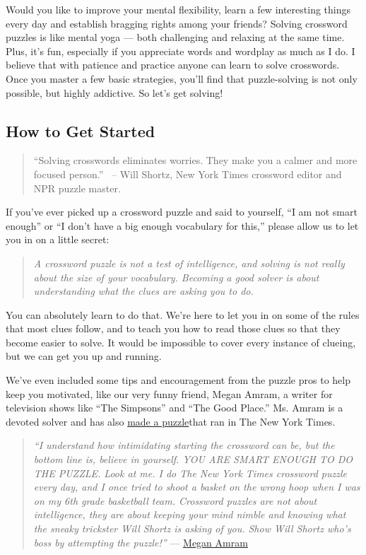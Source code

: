 Would you like to improve your mental flexibility, learn a few
interesting things every day and establish bragging rights among your
friends? Solving crossword puzzles is like mental yoga --- both
challenging and relaxing at the same time. Plus, it's fun, especially if
you appreciate words and wordplay as much as I do. I believe that with
patience and practice anyone can learn to solve crosswords. Once you
master a few basic strategies, you'll find that puzzle-solving is not
only possible, but highly addictive. So let's get solving!

\hypertarget{how-to-get-started}{%
\subsection{How to Get Started}\label{how-to-get-started}}

\begin{quote}
``Solving crosswords eliminates worries. They make you a calmer and more
focused person.'' ~-- Will Shortz, New York Times crossword editor and
NPR puzzle master.
\end{quote}

If you've ever picked up a crossword puzzle and said to yourself, ``I am
not smart enough'' or ``I don't have a big enough vocabulary for this,''
please allow us to let you in on a little secret: ~

\begin{quote}
\emph{A crossword puzzle is not a test of intelligence, and solving is
not really about the size of your vocabulary. Becoming a good solver is
about understanding what the clues are asking you to do.}
\end{quote}

You can absolutely learn to do that. We're here to let you in on some of
the rules that most clues follow, and to teach you how to read those
clues so that they become easier to solve. It would be impossible to
cover every instance of clueing, but we can get you up and running. ~

We've even included some tips and encouragement from the puzzle pros to
help keep you motivated, like our very funny friend, Megan Amram, a
writer for television shows like ``The Simpsons'' and ``The Good
Place.'' Ms. Amram is a devoted solver and has also
\href{https://www.nytimes.com/crosswords/game/daily/2016/06/23}{made a
puzzle}that ran in The New York Times.

\begin{quote}
\emph{``I understand how intimidating starting the crossword can be, but
the bottom line is, believe in yourself. YOU ARE SMART ENOUGH TO DO THE
PUZZLE. Look at me. I do The New York Times crossword puzzle every day,
and I once tried to shoot a basket on the wrong hoop when I was on my
6th grade basketball team. Crossword puzzles are not about intelligence,
they are about keeping your mind nimble and knowing what the sneaky
trickster Will Shortz is asking of you. Show Will Shortz who's boss by
attempting the puzzle!''} ---
\href{https://twitter.com/meganamram}{Megan Amram}
\end{quote}

